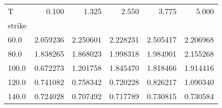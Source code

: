 \begin{tabular}{lrrrrr}
\toprule
T &     0.100 &     1.325 &     2.550 &     3.775 &     5.000 \\
strike &           &           &           &           &           \\
\midrule
60.0   &  2.059236 &  2.250601 &  2.228231 &  2.505417 &  2.206968 \\
80.0   &  1.838265 &  1.868023 &  1.998318 &  1.984901 &  2.155268 \\
100.0  &  0.672273 &  1.201758 &  1.845470 &  1.818466 &  1.914416 \\
120.0  &  0.741082 &  0.758342 &  0.720228 &  0.826217 &  1.090340 \\
140.0  &  0.724028 &  0.707492 &  0.717789 &  0.730815 &  0.730584 \\
\bottomrule
\end{tabular}

